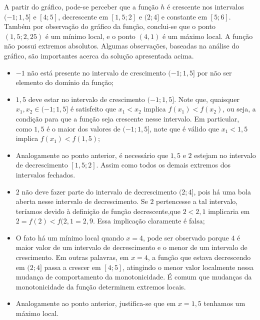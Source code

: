 \begin{solution}
    A partir do gráfico, pode-se perceber que a função $h$ é crescente nos intervalos $(-1;1{,}5]$ e $[4;5]$,
    decrescente em $[1,5; 2]$ e $(2;4]$ e constante em $[5;6]$.     
    Também por observação do gráfico da função, conclui-se que o ponto $(1{,}5; 2{,}25)$ é um mínimo local, e o ponto $(4,1)$ é um máximo local.
    A função não possui extremos absolutos.
    Algumas observações, baseadas na análise do gráfico, são importantes acerca da solução apresentada acima.
    \begin{itemize}
        \item $-1$ não está presente no intervalo de crescimento $(-1;1{,}5]$ por não ser elemento do domínio da função;
        \item $1{,}5$ deve estar no intervalo de crescimento $(-1;1{,}5]$. Note que, quaisquer $x_1, x_2 \in (-1;1{,}5]$ é satisfeito que $x_1 < x_2$ implica $f(x_1) < f(x_2)$, ou seja, a condição para que a função seja crescente nesse intervalo. Em particular, como $1{,}5$ é o maior dos valores de $(-1;1{,}5]$, note que é válido que $x_1 < 1{,}5$ implica $f(x_1) < f(1{,}5)$;
        \item Analogamente ao ponto anterior, é necessário que $1{,}5$ e $2$ estejam no intervalo de decrescimento $[1,5; 2]$. Assim como todos os demais extremos dos intervalos fechados.
        \item $2$ não deve fazer parte do intervalo de decrescimento $(2; 4]$, pois há uma bola aberta nesse intervalo de decrescimento. Se $2$ pertencesse a tal intervalo, teríamos devido à definição de função decrescente,que $2<2{,}1$ implicaria em $2 = f(2) < f(2{,}1 = 2{,}9$. Essa implicação claramente é falsa;
        \item O fato há um mínimo local quando $x = 4$, pode ser observado porque $4$ é maior valor de um intervalo de decrescimento e o menor de um intervalo de crescimento. Em outras palavras, em $x=4$, a função que estava decrescendo em $(2;4]$ passa a crescer em $[4;5]$, atingindo o menor valor localmente nessa mudança de comportamento da monotonicidade. É comum que mudanças da monotonicidade da função determinem extremos locais.
        \item Analogamente ao ponto anterior, justifica-se que em $x=1{,}5$ tenhamos um máximo local.
    \end{itemize}
\end{solution}

